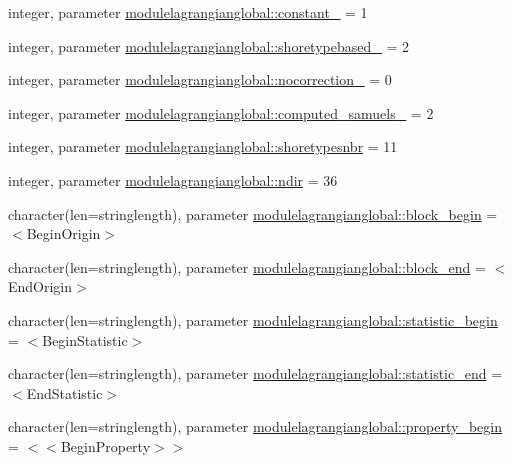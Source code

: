 \begin{DoxyCompactItemize}
\item 
integer, parameter \mbox{\hyperlink{namespacemodulelagrangianglobal_a8d09d3f68ddd2e33f66ccf023f0be8e8}{modulelagrangianglobal\+::constant\+\_\+}} = 1
\item 
integer, parameter \mbox{\hyperlink{namespacemodulelagrangianglobal_ab7750a2f4ac9b6bfeb36230e86a95e8e}{modulelagrangianglobal\+::shoretypebased\+\_\+}} = 2
\item 
integer, parameter \mbox{\hyperlink{namespacemodulelagrangianglobal_aa365610a35e8bf7f2e7952a4ea0fd16a}{modulelagrangianglobal\+::nocorrection\+\_\+}} = 0
\item 
integer, parameter \mbox{\hyperlink{namespacemodulelagrangianglobal_ab8fcc87a00faad18e9cac3e9e65fac08}{modulelagrangianglobal\+::computed\+\_\+samuels\+\_\+}} = 2
\item 
integer, parameter \mbox{\hyperlink{namespacemodulelagrangianglobal_a13654ed8e4e6ce2c40ea217aaa09b53e}{modulelagrangianglobal\+::shoretypesnbr}} = 11
\item 
integer, parameter \mbox{\hyperlink{namespacemodulelagrangianglobal_a3b8fd26719d8ff9cf5b69201dad969f9}{modulelagrangianglobal\+::ndir}} = 36
\item 
character(len=stringlength), parameter \mbox{\hyperlink{namespacemodulelagrangianglobal_adea0db2db49a67ade79b9544d59a5de4}{modulelagrangianglobal\+::block\+\_\+begin}} = \textquotesingle{}$<$Begin\+Origin$>$\textquotesingle{}
\item 
character(len=stringlength), parameter \mbox{\hyperlink{namespacemodulelagrangianglobal_a9d15fdf578b0d1a82ed649a10259a691}{modulelagrangianglobal\+::block\+\_\+end}} = \textquotesingle{}$<$End\+Origin$>$\textquotesingle{}
\item 
character(len=stringlength), parameter \mbox{\hyperlink{namespacemodulelagrangianglobal_ab240a04dd8bd6ec69ce08531b9b91b0e}{modulelagrangianglobal\+::statistic\+\_\+begin}} = \textquotesingle{}$<$Begin\+Statistic$>$\textquotesingle{}
\item 
character(len=stringlength), parameter \mbox{\hyperlink{namespacemodulelagrangianglobal_a3bead975dd95339d652e8f1742a06da7}{modulelagrangianglobal\+::statistic\+\_\+end}} = \textquotesingle{}$<$End\+Statistic$>$\textquotesingle{}
\item 
character(len=stringlength), parameter \mbox{\hyperlink{namespacemodulelagrangianglobal_a8a45bf05f084ecacb030edc3db4dcd08}{modulelagrangianglobal\+::property\+\_\+begin}} = \textquotesingle{}$<$$<$Begin\+Property$>$$>$\textquotesingle{}
\item 

\end{DoxyCompactItemize}
